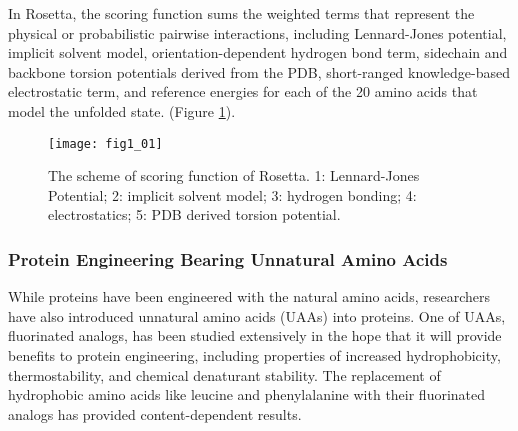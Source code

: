 \begin{refsection}
In Rosetta, the scoring function sums the weighted terms that represent the
physical or probabilistic pairwise interactions\cite{Rohl2004}, including
Lennard-Jones potential\cite{Clementi1999}, implicit solvent
model\cite{Lazaridis1999}, orientation-dependent hydrogen bond
term\cite{Kortemme2003}, sidechain and backbone torsion potentials derived from
the PDB\cite{Rohl2002}, short-ranged knowledge-based electrostatic
term\cite{Leaver-Fay2013a}, and reference energies for each of the 20 amino
acids that model the unfolded state\cite{Leaver-Fay2013a}. (Figure
\ref{fig:rosetta-intro}).
\begin{figure}[h!] \centering \texttt{[image: fig1\_01]}
    \caption[The scheme of scoring function of Rosetta. 1: Lennard-Jones
    Potential; 2: implicit solvent model; 3: hydrogen bonding; 4:
electrostatics; 5: PDB drived torsion potential.]{The scheme of scoring
    function of Rosetta. 1: Lennard-Jones Potential; 2: implicit solvent model;
3: hydrogen bonding; 4: electrostatics; 5: PDB derived torsion potential.}
\label{fig:rosetta-intro}
\end{figure}

\subsubsection{Protein Engineering Bearing Unnatural Amino Acids}
\label{sec:uaa-intro}

While proteins have been engineered with the natural amino acids, researchers
have also introduced unnatural amino acids (UAAs) into
proteins\cite{Odar2015,Hassan2008,Kiick2000,Hammill2007,Meinnel1990,Johnson2010}.
One of UAAs, fluorinated analogs, has been studied extensively in the hope that
it will provide benefits to protein engineering, including properties of
increased hydrophobicity\cite{Biffinger2004},
thermostability\cite{Voloshchuk2010,Baker2011b}, and chemical denaturant
stability\cite{Voloshchuk2007b}. The replacement of hydrophobic amino acids
like leucine and phenylalanine with their fluorinated analogs has provided
content-dependent results\cite{Tang2001}.


\end{refsection}
